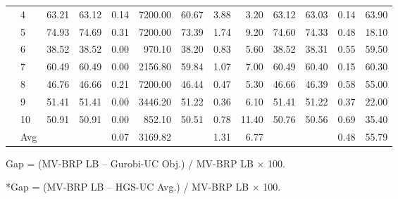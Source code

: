 \documentclass[11pt]{article}
\numberwithin{table}{section}
\numberwithin{figure}{section}
\begin{document}
\begin{landscape}
\begin{table}[p]
\begin{adjustbox}{max width=\linewidth}
\begin{tabular}{llrrrrrrr rrrr}
 & 4 & 63.21 & 63.12 & 0.14 & 7200.00 & 60.67 & 3.88 & 3.20 & 63.12 & 63.03 & 0.14 & 63.90 \\
 & 5 & 74.93 & 74.69 & 0.31 & 7200.00 & 73.39 & 1.74 & 9.20 & 74.60 & 74.33 & 0.48 & 18.10 \\
 & 6 & 38.52 & 38.52 & 0.00 & 970.10 & 38.20 & 0.83 & 5.60 & 38.52 & 38.31 & 0.55 & 59.50 \\
 & 7 & 60.49 & 60.49 & 0.00 & 2156.80 & 59.84 & 1.07 & 7.00 & 60.49 & 60.40 & 0.15 & 60.30 \\
 & 8 & 46.76 & 46.66 & 0.21 & 7200.00 & 46.44 & 0.47 & 5.30 & 46.66 & 46.39 & 0.58 & 55.00 \\
 & 9 & 51.41 & 51.41 & 0.00 & 3446.20 & 51.22 & 0.36 & 6.10 & 51.41 & 51.22 & 0.37 & 22.00 \\
 & 10 & 50.91 & 50.91 & 0.00 & 852.10 & 50.51 & 0.78 & 11.40 & 50.76 & 50.56 & 0.69 & 35.40 \\
\midrule
 & Avg &  &  & 0.07 & 3169.82 &  & 1.31 & 6.77 &  &  & 0.48 & 55.79 \\
\bottomrule
\end{tabular}
\end{adjustbox}
\begin{tablenotes}\footnotesize
\item *Gap = (MV-BRP LB -- Gurobi-UC Obj.) / MV-BRP LB $\times$ 100.
\item **Gap = (MV-BRP LB -- HGS-UC Avg.) / MV-BRP LB $\times$ 100.
\end{tablenotes}
\end{table}
\end{landscape}
\end{document}
